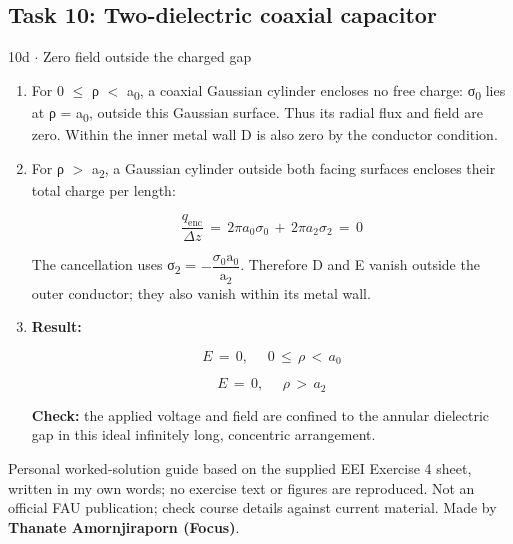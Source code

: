 \documentclass[11pt]{article}
\begin{document}
\begin{keepsection}\subsection{Task 10: Two-dielectric coaxial capacitor}

\begin{workedbox}{10d \ensuremath{\cdot} Zero field outside the charged gap}
\begin{enumerate}
\item For 0 \ensuremath{\leq} ρ \ensuremath{<} a\textsubscript{0}, a coaxial Gaussian cylinder encloses no free charge: σ\textsubscript{0} lies at ρ = a\textsubscript{0}, outside this Gaussian surface. Thus its radial flux and field are zero. Within the inner metal wall D is also zero by the conductor condition.
\item {}
For ρ \ensuremath{>} a\textsubscript{2}, a Gaussian cylinder outside both facing surfaces encloses their total charge per length:

\begin{equation*}\dfrac{{q}_{\text{enc}}}{Δ{z}}\, =\, 2π{a}_{0}σ_{0}\, +\, 2π{a}_{2}σ_{2}\, =\, 0\end{equation*}

The cancellation uses σ\textsubscript{2} = \ensuremath{-}{\small\ensuremath{\dfrac{σ_{0}\mathrm{a}_{0}}{\mathrm{a}_{2}}}}. Therefore D and E vanish outside the outer conductor; they also vanish within its metal wall.
\item {}
\textbf{Result:}

\begin{equation*}{E}\, =\, 0,\, \quad \, 0\, \leq \, ρ\, <\, {a}_{0}\end{equation*}

\begin{equation*}{E}\, =\, 0,\, \quad \, ρ\, >\, {a}_{2}\end{equation*}

\textbf{Check:} the applied voltage and field are confined to the annular dielectric gap in this ideal infinitely long, concentric arrangement.
\end{enumerate}
\end{workedbox}

\end{keepsection}

\vfill{\small Personal worked-solution guide based on the supplied EEI Exercise 4 sheet, written in my own words; no exercise text or figures are reproduced. Not an official FAU publication; check course details against current material. Made by \textbf{Thanate Amornjiraporn (Focus)}.}
\end{document}
